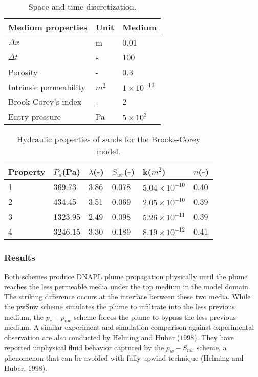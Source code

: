 \begin{table}[!htb]
\begin{center}
\begin{tabular}{|l|l|l|}
\hline
Medium properties & Unit & Medium\\
\hline
$\Delta x$ & m &	0.01 \\
\hline
$\Delta t$ & s &	100 \\
\hline
Porosity & - &	0.3 \\
\hline
Intrinsic permeability & $m^2$ & $1\times10^{-10}$ \\
\hline
Brook-Corey's index &	- &	2 \\
\hline
Entry pressure & Pa & $5\times10^3$ \\
\hline
\end{tabular}
\caption{Space and time discretization.}
\end{center}
\end{table}

\begin{table}[!htb]
\begin{center}
\begin{tabular}{|l|l|l|l|l|l|}
\hline
Property & $P_d$(Pa) & $\lambda$(-) &	$S_{wr}$(-) &	k($m^2$) &	$n$(-) \\
\hline
1	& 369.73 & 3.86	& 0.078	& $5.04\times10^{-10}$ & 0.40 \\ 
\hline
2	& 434.45 & 3.51 & 0.069 &	$2.05\times10^{-10}$ & 0.39 \\
\hline
3	& 1323.95 &	2.49 & 0.098 &	$5.26\times10^{-11}$ & 0.39 \\
\hline
4	& 3246.15	& 3.30 & 0.189 & $8.19\times10^{-12}$ &	0.41 \\
\hline
\end{tabular}
\caption{Hydraulic properties of sands for the Brooks-Corey model.}
\end{center}
\end{table}

\subsubsection*{Results}
Both schemes produce DNAPL plume propagation physically until the plume reaches the less permeable media under the top medium in the model domain. The striking difference occurs at the interface between these two media. While the pwSnw scheme simulates the plume to infiltrate into the less previous medium, the $p_c-p_{nw}$ scheme forces the plume to bypass the less previous medium. A similar experiment and simulation comparison against experimental observation are also conducted by Helming and Huber ($1998$). They have reported unphysical fluid behavior captured by the $p_w-S_{nw}$ scheme, a phenomenon that can be avoided with fully upwind technique (Helming and Huber, $1998$). 

